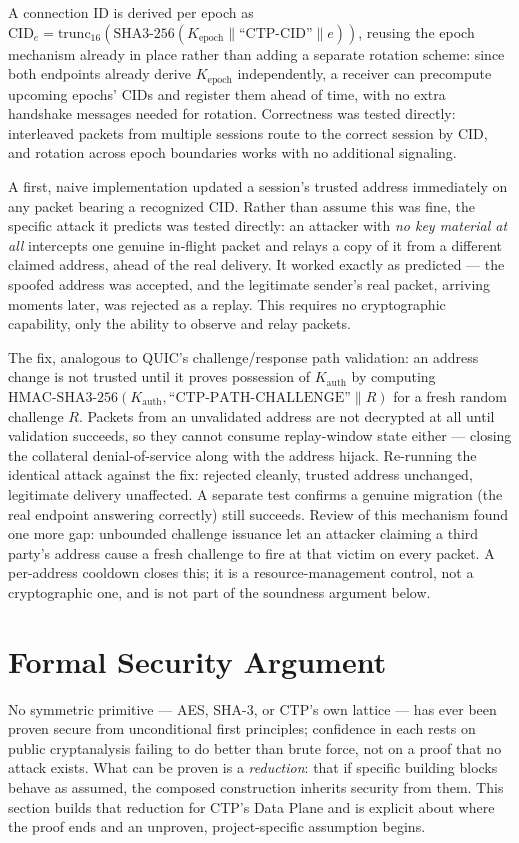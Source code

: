 \documentclass[twocolumn,10pt,journal,compsoc]{IEEEtran}
\begin{document}
A connection ID is derived per epoch as $\text{CID}_e = \text{trunc}_{16}(\text{SHA3-256}(K_{\text{epoch}} \| \text{``CTP-CID''} \| e))$, reusing the epoch mechanism already in place rather than adding a separate rotation scheme: since both endpoints already derive $K_{\text{epoch}}$ independently, a receiver can precompute upcoming epochs' CIDs and register them ahead of time, with no extra handshake messages needed for rotation. Correctness was tested directly: interleaved packets from multiple sessions route to the correct session by CID, and rotation across epoch boundaries works with no additional signaling.

A first, naive implementation updated a session's trusted address immediately on any packet bearing a recognized CID. Rather than assume this was fine, the specific attack it predicts was tested directly: an attacker with \emph{no key material at all} intercepts one genuine in-flight packet and relays a copy of it from a different claimed address, ahead of the real delivery. It worked exactly as predicted --- the spoofed address was accepted, and the legitimate sender's real packet, arriving moments later, was rejected as a replay. This requires no cryptographic capability, only the ability to observe and relay packets.

The fix, analogous to QUIC's challenge/response path validation: an address change is not trusted until it proves possession of $K_{\text{auth}}$ by computing $\text{HMAC-SHA3-256}(K_{\text{auth}}, \text{``CTP-PATH-CHALLENGE''} \| R)$ for a fresh random challenge $R$. Packets from an unvalidated address are not decrypted at all until validation succeeds, so they cannot consume replay-window state either --- closing the collateral denial-of-service along with the address hijack. Re-running the identical attack against the fix: rejected cleanly, trusted address unchanged, legitimate delivery unaffected. A separate test confirms a genuine migration (the real endpoint answering correctly) still succeeds. Review of this mechanism found one more gap: unbounded challenge issuance let an attacker claiming a third party's address cause a fresh challenge to fire at that victim on every packet. A per-address cooldown closes this; it is a resource-management control, not a cryptographic one, and is not part of the soundness argument below.

\section{Formal Security Argument}
\label{sec:formal}
No symmetric primitive --- AES, SHA-3, or CTP's own lattice --- has ever been proven secure from unconditional first principles; confidence in each rests on public cryptanalysis failing to do better than brute force, not on a proof that no attack exists. What can be proven is a \emph{reduction}: that if specific building blocks behave as assumed, the composed construction inherits security from them. This section builds that reduction for CTP's Data Plane and is explicit about where the proof ends and an unproven, project-specific assumption begins.
\end{document}
